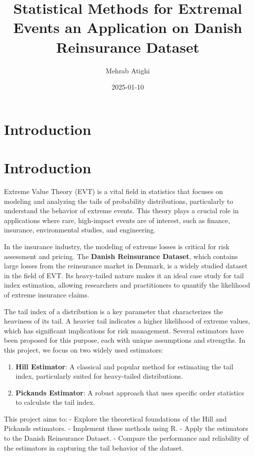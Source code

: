 \documentclass[
  12pt,
]{article}
\title{Statistical Methods for Extremal Events an Application on Danish
Reinsurance Dataset}
\author{Mehrab Atighi}
\date{2025-01-10}
\providecommand{\tightlist}{%
  \setlength{\itemsep}{0pt}\setlength{\parskip}{0pt}}
\begin{document}
\maketitle

{
\setcounter{tocdepth}{3}
\tableofcontents
}
\section{Introduction}\label{introduction}

\section{Introduction}\label{introduction-1}

Extreme Value Theory (EVT) is a vital field in statistics that focuses
on modeling and analyzing the tails of probability distributions,
particularly to understand the behavior of extreme events. This theory
plays a crucial role in applications where rare, high-impact events are
of interest, such as finance, insurance, environmental studies, and
engineering.

In the insurance industry, the modeling of extreme losses is critical
for risk assessment and pricing. The \textbf{Danish Reinsurance
Dataset}, which contains large losses from the reinsurance market in
Denmark, is a widely studied dataset in the field of EVT. Its
heavy-tailed nature makes it an ideal case study for tail index
estimation, allowing researchers and practitioners to quantify the
likelihood of extreme insurance claims.

The tail index of a distribution is a key parameter that characterizes
the heaviness of its tail. A heavier tail indicates a higher likelihood
of extreme values, which has significant implications for risk
management. Several estimators have been proposed for this purpose, each
with unique assumptions and strengths. In this project, we focus on two
widely used estimators:

\begin{enumerate}
\def\labelenumi{\arabic{enumi}.}
\tightlist
\item
  \textbf{Hill Estimator}: A classical and popular method for estimating
  the tail index, particularly suited for heavy-tailed distributions.
\item
  \textbf{Pickands Estimator}: A robust approach that uses specific
  order statistics to calculate the tail index.
\end{enumerate}

This project aims to: - Explore the theoretical foundations of the Hill
and Pickands estimators. - Implement these methods using R. - Apply the
estimators to the Danish Reinsurance Dataset. - Compare the performance
and reliability of the estimators in capturing the tail behavior of the
dataset.
\end{document}
